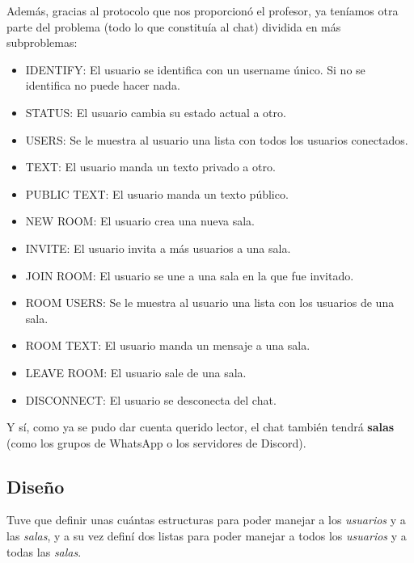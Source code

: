 \documentclass{article}
\begin{document}
Además, gracias al protocolo que nos proporcionó el profesor, ya teníamos otra parte del problema (todo lo que constituía al chat) dividida en más subproblemas:

\begin{itemize}
    \item IDENTIFY: El usuario se identifica con un username único. Si no se identifica no puede hacer nada.
    \item STATUS: El usuario cambia su estado actual a otro.
    \item USERS: Se le muestra al usuario una lista con todos los usuarios conectados.
    \item TEXT: El usuario manda un texto privado a otro.
    \item PUBLIC TEXT: El usuario manda un texto público.
    \item NEW ROOM: El usuario crea una nueva sala.
    \item INVITE: El usuario invita a más usuarios a una sala.
    \item JOIN ROOM: El usuario se une a una sala en la que fue invitado.
    \item ROOM USERS: Se le muestra al usuario una lista con los usuarios de una sala.
    \item ROOM TEXT: El usuario manda un mensaje a una sala.
    \item LEAVE ROOM: El usuario sale de una sala.
    \item DISCONNECT: El usuario se desconecta del chat.
\end{itemize}

Y sí, como ya se pudo dar cuenta querido lector, el chat también tendrá \textbf{salas} (como los grupos de WhatsApp o los servidores de Discord).

\subsection{Diseño}
Tuve que definir unas cuántas estructuras para poder manejar a los \textit{usuarios} y a las \textit{salas}, y a su vez definí dos listas para
poder manejar a todos los \textit{usuarios} y a todas las \textit{salas}.
\end{document}
